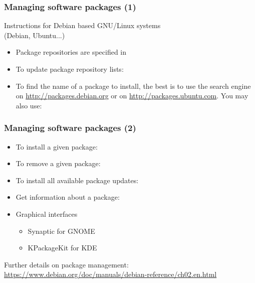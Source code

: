 \begin{frame}
  \frametitle{Managing software packages (1)}
  Instructions for Debian based GNU/Linux systems\\
  (Debian, Ubuntu...)
  \begin{itemize}
  \item Package repositories are specified in 
  \item To update package repository lists:\\
  \item To find the name of a package to install, the best is to use
    the search engine on \url{http://packages.debian.org} or on
    \url{http://packages.ubuntu.com}. You may
    also use:\\
  \end{itemize}
\end{frame}

\begin{frame}
  \frametitle{Managing software packages (2)}
  \begin{itemize}
  \item To install a given package:\\
  \item To remove a given package:\\
  \item To install all available package updates:\\
  \item Get information about a package:\\
  \item Graphical interfaces
    \begin{itemize}
    \item Synaptic for GNOME
    \item KPackageKit for KDE
    \end{itemize}
  \end{itemize}
  Further details on package management:\\
  \url{https://www.debian.org/doc/manuals/debian-reference/ch02.en.html}
\end{frame}

